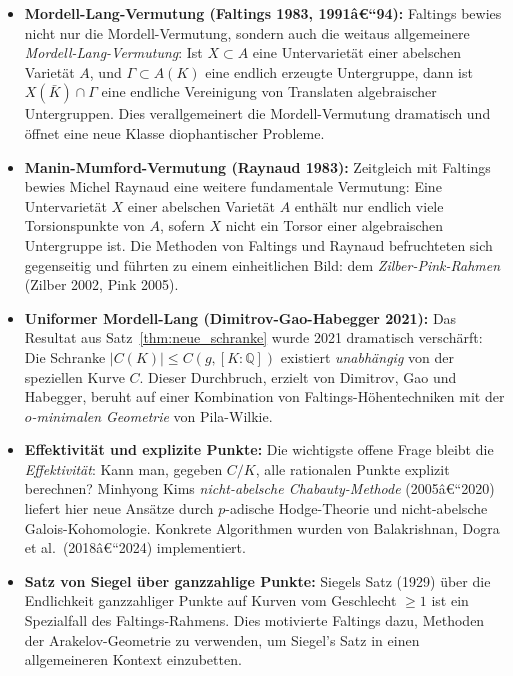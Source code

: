 ﻿\documentclass[12pt,a4paper]{article}
\theoremstyle{plain}
\theoremstyle{definition}
\theoremstyle{remark}
\newcommand{\Q}{\mathbb{Q}}
\begin{document}
\begin{itemize}[leftmargin=2em,itemsep=4pt]
  \item \textbf{Mordell-Lang-Vermutung (Faltings 1983, 1991â€“94):}
    Faltings bewies nicht nur die Mordell-Vermutung, sondern auch die weitaus allgemeinere
    \emph{Mordell-Lang-Vermutung}: Ist $X \subset A$ eine Untervarietät einer abelschen
    Varietät $A$, und $\Gamma \subset A(K)$ eine endlich erzeugte Untergruppe,
    dann ist $X(\bar K) \cap \Gamma$ eine endliche Vereinigung von Translaten algebraischer
    Untergruppen. Dies verallgemeinert die Mordell-Vermutung dramatisch und öffnet
    eine neue Klasse diophantischer Probleme.

  \item \textbf{Manin-Mumford-Vermutung (Raynaud 1983):}
    Zeitgleich mit Faltings bewies Michel Raynaud eine weitere fundamentale Vermutung:
    Eine Untervarietät $X$ einer abelschen Varietät $A$ enthält nur endlich viele
    Torsionspunkte von $A$, sofern $X$ nicht ein Torsor einer algebraischen Untergruppe ist.
    Die Methoden von Faltings und Raynaud befruchteten sich gegenseitig und führten
    zu einem einheitlichen Bild: dem \emph{Zilber-Pink-Rahmen} (Zilber 2002, Pink 2005).

  \item \textbf{Uniformer Mordell-Lang (Dimitrov-Gao-Habegger 2021):}
    Das Resultat aus Satz~\ref{thm:neue_schranke} wurde 2021 dramatisch verschärft:
    Die Schranke $|C(K)| \leq C(g, [K:\Q])$ existiert \emph{unabhängig} von der
    speziellen Kurve $C$. Dieser Durchbruch, erzielt von Dimitrov, Gao und Habegger,
    beruht auf einer Kombination von Faltings-Höhentechniken mit der
    \emph{$o$-minimalen Geometrie} von Pila-Wilkie.

  \item \textbf{Effektivität und explizite Punkte:}
    Die wichtigste offene Frage bleibt die \emph{Effektivität}: Kann man, gegeben $C/K$,
    alle rationalen Punkte explizit berechnen? Minhyong Kims \emph{nicht-abelsche
    Chabauty-Methode} (2005â€“2020) liefert hier neue Ansätze durch
    $p$-adische Hodge-Theorie und nicht-abelsche Galois-Kohomologie.
    Konkrete Algorithmen wurden von Balakrishnan, Dogra et al.\ (2018â€“2024) implementiert.

  \item \textbf{Satz von Siegel über ganzzahlige Punkte:}
    Siegels Satz (1929) über die Endlichkeit ganzzahliger Punkte auf Kurven vom Geschlecht
    $\geq 1$ ist ein Spezialfall des Faltings-Rahmens. Dies motivierte Faltings dazu,
    Methoden der Arakelov-Geometrie zu verwenden, um Siegel's Satz in einen allgemeineren
    Kontext einzubetten.
\end{itemize}
\end{document}
